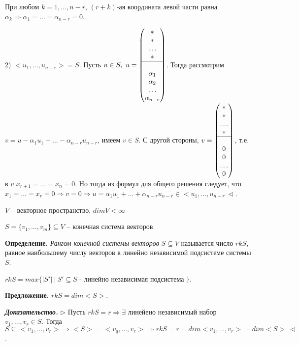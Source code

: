 При любом $k = 1, \dots, n-r$, $(r + k)$-ая координата левой части равна $\alpha_k \Rightarrow \alpha_1 = \dots = \alpha_{n-r} = 0$.

2) $<u_1, \dots, u_{n-r}> = S$. Пусть $u \in S, \ u = \begin{pmatrix} * \\ * \\ \dots \\ * \\ \hline
 \\ \alpha_1 \\ \alpha_2 \\ \dots \\ \alpha_{n-r} \end{pmatrix}$. Тогда рассмотрим $v = u - \alpha_1 u_1 - \dots - \alpha_{n-r} u_{n - r}$, имеем $v \in S$. С другой стороны, $v = \begin{pmatrix} * \\ * \\ \dots \\ * \\ \hline
 \\ 0 \\ 0 \\ \dots \\ 0 \end{pmatrix}$, т.е. в $v$ $x_{r+1} = \dots = x_n = 0$. Но тогда из формул для общего решения следует, что $x_1 = \dots = x_r = 0 \Rightarrow v = 0 \Rightarrow u = \alpha_1 u_1 + \dots + \alpha_{n-r} u _{n-r} \in <u_1, \dots, u_{n-r} \ \lhd$.

\vspace{\baselineskip}
$V$ -- векторное пространство, $dimV < \infty$

$S = \{v_1, \dots, v_m\} \subseteq V$ -- конечная система векторов

\vspace{\baselineskip}
\textbf{Определение.} \textit{Рангом конечной системы векторов} $S \subseteq V$  называется число $rkS$, равное наибольшему числу векторов в линейно независимой подсистеме системы $S$.

$rkS = max\{|S'| \ | \ S' \subseteq S$ - линейно независимая подсистема $\}$.

\vspace{\baselineskip}
\textbf{Предложение.} $rkS = dim <S>$.

\vspace{\baselineskip}
\textbf{\textit{Доказательство.}} $\rhd$ Пусть $rkS = r \Rightarrow \exists$ линейено независимый набор $v_1, \dots, v_r \in S$. Тогда $S \subseteq <v_1, \dots, v_r> \Rightarrow <S> = <v_q, \dots, v_r> \Rightarrow rkS = r = dim <v_1, \dots, v_r> = dim <S> \ \lhd$.

